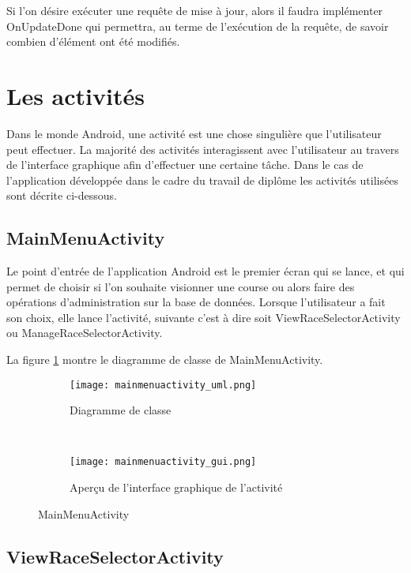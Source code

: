 Si l'on désire exécuter une requête de mise à jour, alors il faudra implémenter OnUpdateDone qui permettra, au terme de l'exécution de la requête, de savoir combien d'élément ont été modifiés.

\section{Les activités}

Dans le monde Android, une activité est une chose singulière que l'utilisateur peut effectuer. La majorité des activités interagissent avec l'utilisateur au travers de l'interface graphique afin d'effectuer une certaine tâche. \cite{android-activity} Dans le cas de l'application développée dans le cadre du travail de diplôme les activités utilisées sont décrite ci-dessous.

\subsection{MainMenuActivity}

Le point d'entrée de l'application Android est le premier écran qui se lance, et qui permet de choisir si l'on souhaite visionner une course ou alors faire des opérations d'administration sur la base de données. Lorsque l'utilisateur a fait son choix, elle lance l'activité, suivante c'est à dire soit ViewRaceSelectorActivity ou ManageRaceSelectorActivity.

La figure \ref{fig:mainmenuactivity_uml} montre le diagramme de classe de MainMenuActivity.

\begin{figure}[htb!]
    \centering
    \begin{subfigure}[htb]{0.49\textwidth}
		\texttt{[image: mainmenuactivity\_uml.png]} 
		\caption{Diagramme de classe}
		\label{fig:mainmenuactivity_uml}
    \end{subfigure}
    ~ %
    \begin{subfigure}[htb]{0.49\textwidth}
		\texttt{[image: mainmenuactivity\_gui.png]} 
		\caption{Aperçu de l'interface graphique de l'activité}
		\label{fig:mainmenuactivity_gui}
    \end{subfigure}
    \caption{MainMenuActivity}\label{fig:mainmenuactivity_fig}
\end{figure}

\subsection{ViewRaceSelectorActivity}

